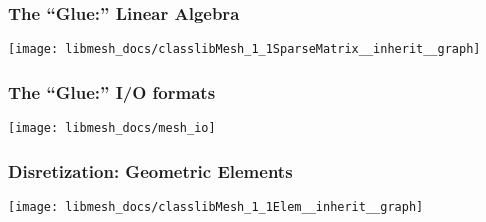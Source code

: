 








\frame
{
  \Large
  \begin{block}{}
    \center{\bf \libmesh{}}
  \end{block}
}



\frame
{
  \frametitle{The ``Glue:'' Linear Algebra}
  \begin{center}
    \texttt{[image: libmesh\_docs/classlibMesh\_1\_1SparseMatrix\_\_inherit\_\_graph]}
  \end{center}
}



\frame
{
  \frametitle{The ``Glue:'' I/O formats}
  \begin{center}
    \texttt{[image: libmesh\_docs/mesh\_io]}
  \end{center}
}






\frame
{
  \frametitle{Disretization: Geometric Elements}
  \begin{center}
    \texttt{[image: libmesh\_docs/classlibMesh\_1\_1Elem\_\_inherit\_\_graph]}
  \end{center}
}



